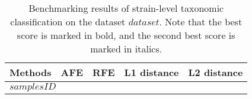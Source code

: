 \begin{table}[ht]
\renewcommand\arraystretch{1.}
    \centering
    \small
    \setlength\tabcolsep{2pt} 
    \begin{tabular}{p{}| p{1.5cm}<{\centering} p{1.5cm}<{\centering} p{1.5cm}<{\centering} p{1.5cm}<{\centering} }

    \toprule
    Methods & AFE & RFE & L1 distance & L2 distance \\
    \midrule
    \multicolumn{4}{l}{$samplesID$} \\
    \hline     
\bottomrule
    \end{tabular}
    \vspace{1mm}
    \caption{Benchmarking results of strain-level taxonomic classification on the dataset $dataset$. Note that the best score is marked in bold, and the second best score is marked in italics. }
    \label{tab:res_strain_$dataset$}
\end{table}